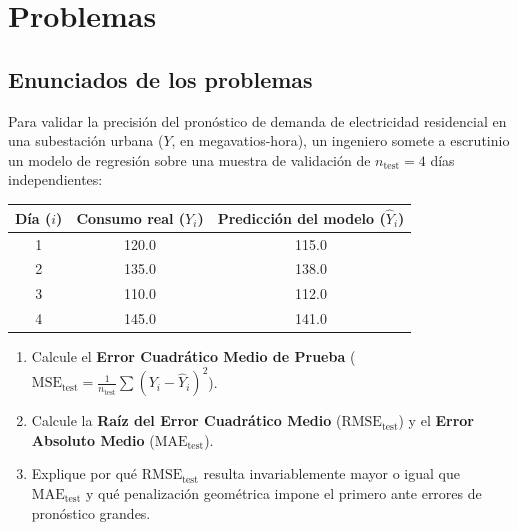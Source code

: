 \section*{Problemas}

\subsection*{Enunciados de los problemas}

\begin{problema}
	\label{prob:ca86634}
	Para validar la precisión del pronóstico de demanda de electricidad residencial en una subestación urbana ($Y$, en megavatios-hora), un ingeniero somete a escrutinio un modelo de regresión sobre una muestra de validación de $n_{\text{test}} = 4$ días independientes:
	\begin{center}
		\begin{tabular}{ccc}
			\hline
			\textbf{Día ($i$)} & \textbf{Consumo real ($Y_i$)} & \textbf{Predicción del modelo ($\hat{Y}_i$)} \\ \hline
			1 & 120.0 & 115.0 \\
			2 & 135.0 & 138.0 \\
			3 & 110.0 & 112.0 \\
			4 & 145.0 & 141.0 \\ \hline
		\end{tabular}
	\end{center}
	\begin{enumerate}
		\item Calcule el \textbf{Error Cuadrático Medio de Prueba} ($\text{MSE}_{\text{test}} = \frac{1}{n_{\text{test}}}\sum(Y_i-\hat{Y}_i)^2$).
		\item Calcule la \textbf{Raíz del Error Cuadrático Medio} ($\text{RMSE}_{\text{test}}$) y el \textbf{Error Absoluto Medio} ($\text{MAE}_{\text{test}}$).
		\item Explique por qué $\text{RMSE}_{\text{test}}$ resulta invariablemente mayor o igual que $\text{MAE}_{\text{test}}$ y qué penalización geométrica impone el primero ante errores de pronóstico grandes.
	\end{enumerate}
\end{problema}

